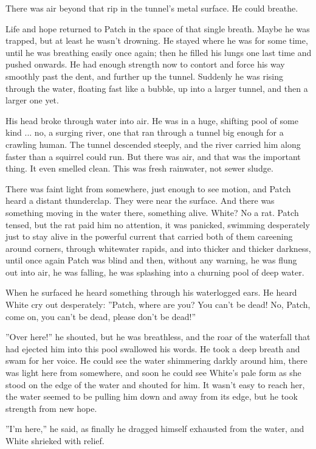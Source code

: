 \documentclass[11pt]{article}
\begin{document}
There was air beyond that rip in the tunnel's metal surface. He could breathe.\par
 Life and hope returned to Patch in the space of that single breath. Maybe he was trapped, but at least he wasn't drowning. He stayed where he was for some time, until he was breathing easily once again; then he filled his lungs one last time and pushed onwards. He had enough strength now to contort and force his way smoothly past the dent, and further up the tunnel. Suddenly he was rising through the water, floating fast like a bubble, up into a larger tunnel, and then a larger one yet.\par
 His head broke through water into air. He was in a huge, shifting pool of some kind ... no, a surging river, one that ran through a tunnel big enough for a crawling human. The tunnel descended steeply, and the river carried him along faster than a squirrel could run. But there was air, and that was the important thing. It even smelled clean. This was fresh rainwater, not sewer sludge.\par
 There was faint light from somewhere, just enough to see motion, and Patch heard a distant thunderclap. They were near the surface. And there was something moving in the water there, something alive. White? No %
 a rat. Patch tensed, but the rat paid him no attention, it was panicked, swimming desperately just to stay alive in the powerful current that carried both of them careening around corners, through whitewater rapids, and into thicker and thicker darkness, until once again Patch was blind %
 and then, without any warning, he was flung out into air, he was falling, he was splashing into a churning pool of deep water.\par
 When he surfaced he heard something through his waterlogged ears. He heard White cry out desperately: ''Patch, where are you? You can't be dead! No, Patch, come on, you can't be dead, please don't be dead!''\par
 ''Over here!'' he shouted, but he was breathless, and the roar of the waterfall that had ejected him into this pool swallowed his words. He took a deep breath and swam for her voice. He could see the water shimmering darkly around him, there was light here from somewhere, and soon he could see White's pale form as she stood on the edge of the water and shouted for him. It wasn't easy to reach her, the water seemed to be pulling him down and away from its edge, but he took strength from new hope.\par
 ''I'm here,'' he said, as finally he dragged himself exhausted from the water, and White shrieked with relief.\par
\end{document}
